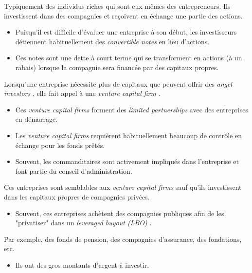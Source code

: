 \documentclass[10pt, french]{article}
\begin{document}
\begin{multicols*}{2}
\begin{definitionNOHFILLsub}
Typiquement des individus riches qui sont eux-mêmes des entrepreneurs. Ils investissent dans des compagnies et reçoivent en échange une partie des actions.
\begin{itemize}
	\item	Puisqu'il est difficile d'évaluer une entreprise à son début, les investisseurs détiennent habituellement des \og \textit{convertible notes} \fg{} en lieu d'actions.
	\item	Ces notes sont une dette à court terme qui se transforment en actions (à un rabais) lorsque la compagnie sera financée par des capitaux propres.
\end{itemize}
\end{definitionNOHFILLsub}

\begin{definitionNOHFILLsub}
Lorsqu'une entreprise nécessite plus de capitaux que peuvent offrir des \og \textit{angel investors} \fg{}, elle fait appel à une \og \textit{venture capital firm} \fg{}.
\begin{itemize}
	\item	Ces \og \textit{venture capital firms} \fg{} forment des \og \textit{limited partnerships} \fg{} avec des entreprises en démarrage.
	\item	Les \og \textit{venture capital firms} requièrent habituellement beaucoup de contrôle en échange pour les fonds prêtés.
	\item	Souvent, les commanditaires sont activement impliqués dans l'entreprise et font partie du conseil d'administration.
\end{itemize}
\end{definitionNOHFILLsub}

\begin{definitionNOHFILLsub}
Ces entreprises sont semblables aux \og \textit{venture capital firms} \fg{} sauf qu'ils investissent dans les capitaux propres de compagnies privées. 
\begin{itemize}
	\item	Souvent, ces entreprises achètent des compagnies publiques afin de les "privatiser" dans un \og \textit{leveraged buyout (LBO)} \fg{}.
\end{itemize}
\end{definitionNOHFILLsub}

\begin{definitionNOHFILLsub}
Par exemple, des fonds de pension, des compagnies d'assurance, des fondations, etc.
\begin{itemize}
	\item	Ils ont des gros montants d'argent à investir.
\end{itemize}
\end{definitionNOHFILLsub}


\end{multicols*}
\end{document}
